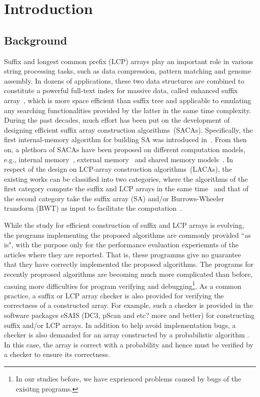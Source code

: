 \documentclass[10pt,journal,compsoc]{IEEEtran}
\begin{document}
\section{Introduction}\label{sec:introduction}

\subsection{Background} \label{sec:introduction:background}


Suffix and longest common prefix (LCP) arrays play an important role in various string processing tasks, such as data compression, pattern matching and genome assembly. In dozens of applications, these two data structures are combined to constitute a powerful full-text index for massive data, called enhanced suffix array~\cite{Abouelhodaa2004}, which is more space efficient than suffix tree and applicable to emulating any searching functionalities provided by the latter in the same time complexity. During the past decades, much effort has been put on the development of designing efficient suffix array construction algorithms~(SACAs). Specifically, the first internal-memory algorithm for building SA was introduced in~\cite{Manber1993}. From then on, a plethora of SACAs have been proposed on different computation models, e.g., internal memory~\cite{Karkkainen2003, Ko2003, Kim2003, Nong11}, external memory~\cite{Dementiev2008, Ferragina2012, Manzini2004, Bingmann12, Karkkainen2014, Nong14, Nong15} and shared memory models~\cite{Osipov2012, Deo2013, Wang2015, Karkkainen2015}. In respect of the design on LCP-array construction algorithms~(LACAs), the existing works can be classified into two categories, where the algorithms of the first category compute the suffix and LCP arrays in the same time~\cite{Fischer11, Bingmann12, Flick2015} and that of the second category take the suffix array (SA) and/or Burrows-Wheeler transform (BWT) as input to facilitate the computation~\cite{Kasai2001,Karkkainen2009, Fischer11, Puglisi2008, Puglisi2008, Deo2013, Karkkainen2016}.


While the study for efficient construction of suffix and LCP arrays is evolving, the programs implementing the proposed algorithms are commonly provided ``as is", with the purpose only for the performance evaluation experiemnts of the articles where they are reported. That is, these programms give no guarantee that they have correctly implemented the proposed algorithms. The programs for recently proprosed algorithms are becoming much more complicated than before, casuing more difficulties for program verifying and debugging\footnote{In our studies before, we have exprienced problems caused by bugs of the exisitng programs.}. As a common practice, a suffix or LCP array checker is also provided for verifying the correctness of a constructed array. For example, such a checker is provided in the software packages eSAIS \cite{xxx} (DC3, pScan and etc? more and better) for constructing suffix and/or LCP arrays. In addition to help avoid implementation bugs, a checker is also demanded for an array constructed by a probabilistic algorithm \cite{Bille2013}. In this case, the array is correct with a probability and hence must be verified by a checker to ensure its correctness.
\end{document}
